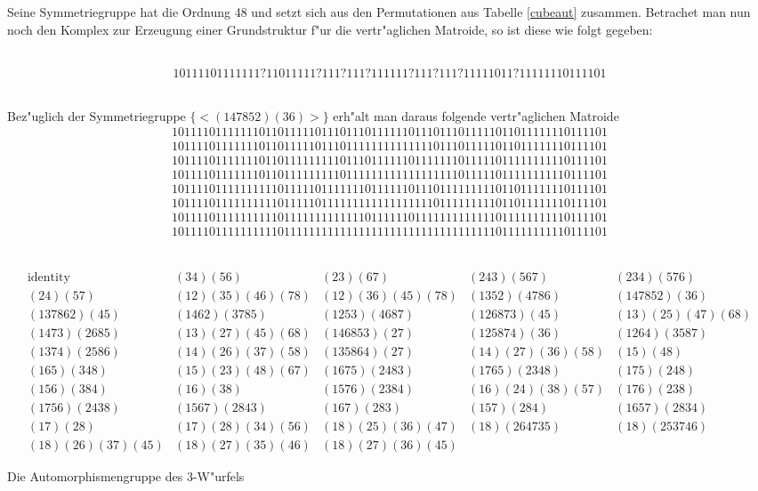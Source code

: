 Seine Symmetriegruppe hat die Ordnung 48 und setzt sich aus den
Permutationen aus Tabelle \ref{cubeaut} zusammen. Betrachet man nun
noch den Komplex zur Erzeugung einer Grundstruktur f"ur die vertr"aglichen
Matroide, so ist diese wie folgt gegeben:

{\small\tt
$$10111101111111?11011111?111?111?111111?111?111?11111011?11111110111101$$
}

Bez"uglich der Symmetriegruppe $\{<(147852)(36)>\}$ erh"alt man daraus folgende
vertr"aglichen Matroide
{\small\tt
$$\begin{array}{c}
1011110111111101101111101110111011111101110111011111011011111110111101\\[1mm]
1011110111111101101111101110111111111111110111011111011011111110111101\\[1mm]
1011110111111101101111111110111011111101111111011111011111111110111101\\[1mm]
1011110111111101101111111110111111111111111111011111011111111110111101\\[1mm]
1011110111111111101111101111111011111101110111111111011011111110111101\\[1mm]
1011110111111111101111101111111111111111110111111111011011111110111101\\[1mm]
1011110111111111101111111111111011111101111111111111011111111110111101\\[1mm]
1011110111111111101111111111111111111111111111111111011111111110111101
\end{array}
$$
}

\begin{table}%
{\footnotesize
$$
\begin{array}{lllll}
\mbox{identity}&(34)(56)&(23)(67)&(243)(567)&(234)(576)\\
(24)(57)&(12)(35)(46)(78)&(12)(36)(45)(78)&(1352)(4786)&(147852)(36)\\
(137862)(45)&(1462)(3785)&(1253)(4687)&(126873)(45)&(13)(25)(47)(68)\\
(1473)(2685)&(13)(27)(45)(68)&(146853)(27)&(125874)(36)&(1264)(3587)\\
(1374)(2586)&(14)(26)(37)(58)&(135864)(27)&(14)(27)(36)(58)&(15)(48)\\
(165)(348)&(15)(23)(48)(67)&(1675)(2483)&(1765)(2348)&(175)(248)\\
(156)(384)&(16)(38)&(1576)(2384)&(16)(24)(38)(57)&(176)(238)\\
(1756)(2438)&(1567)(2843)&(167)(283)&(157)(284)&(1657)(2834)\\
(17)(28)&(17)(28)(34)(56)&(18)(25)(36)(47)&(18)(264735)&(18)(253746)\\
(18)(26)(37)(45)&(18)(27)(35)(46)&(18)(27)(36)(45)
\end{array}$$}
\caption{Die Automorphismengruppe des 3-W"urfels}
\label{cubeaut}
\end{table}

